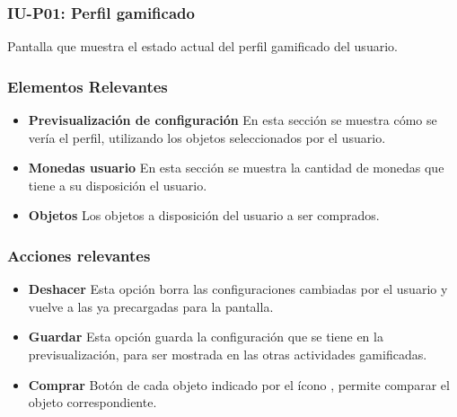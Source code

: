 
\subsubsection{IU-P01: Perfil gamificado}

 Pantalla que muestra el estado actual del perfil gamificado del usuario.



\subsubsection{Elementos Relevantes}

    \begin{itemize}
        \item {\bf Previsualización de configuración}
            En esta sección se muestra cómo se vería el perfil, utilizando los objetos seleccionados por el usuario.
        \item {\bf Monedas usuario}
            En esta sección se muestra la cantidad de monedas que tiene a su disposición el usuario.
        \item {\bf Objetos}
            Los objetos a disposición del usuario a ser comprados.
    \end{itemize}

\subsubsection{Acciones relevantes}

    \begin{itemize}
        \item {\bf Deshacer}
            Esta opción borra las configuraciones cambiadas por el usuario y vuelve a las ya precargadas para la pantalla.
        \item {\bf Guardar}
            Esta opción guarda la configuración que se tiene en la previsualización, para ser  mostrada en las otras actividades gamificadas.
        \item {\bf Comprar}
            Botón de cada objeto indicado por el ícono \IUMonedas{}, permite comparar el objeto correspondiente.
    \end{itemize}

\clearpage
